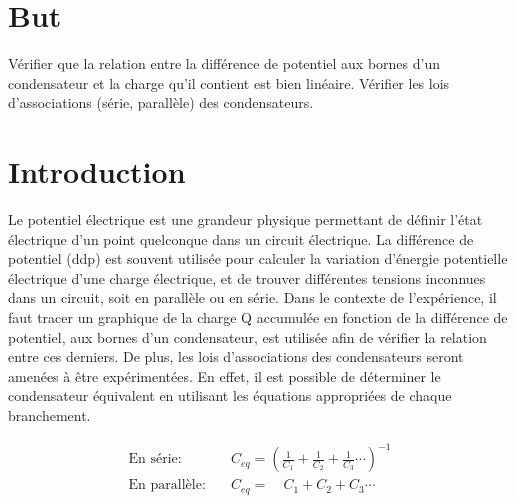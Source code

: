 \documentclass[11pt]{article}
\begin{document}

\setcounter{page}{2}
\section{But}
Vérifier que la relation entre la différence de potentiel aux bornes d’un condensateur et la charge qu’il contient est bien linéaire. Vérifier les lois d’associations (série, parallèle) des condensateurs.\\

\section{Introduction}
Le potentiel électrique est une grandeur physique permettant de définir l’état électrique d’un point quelconque dans un circuit électrique. La différence de potentiel (ddp) est souvent utilisée pour calculer la variation d’énergie potentielle électrique d’une charge électrique, et de trouver différentes tensions inconnues dans un circuit, soit en parallèle ou en série. Dans le contexte de l’expérience, il faut tracer un graphique de la charge Q accumulée en fonction de la différence de potentiel, aux bornes d’un condensateur, est utilisée afin de vérifier la relation entre ces derniers. De plus, les lois d’associations des condensateurs seront amenées à être expérimentées. En effet, il est possible de déterminer le condensateur équivalent en utilisant les équations appropriées de chaque branchement. 

\begin{equation*}
\begin{split}
\text{En série:}    &\quad C_{eq}=\left (\frac{1}{C_{1}}+\frac{1}{C_{2}}+\frac{1}{C_{3}}\cdots\right )^{-1}\\
\text{En parallèle:}&\quad C_{eq}=\quad C_{1}+C_{2}+C_{3}\cdots
\end{split}
\end{equation*}
\end{document}
